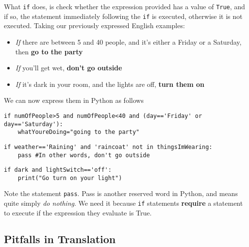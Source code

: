 What \texttt{if} does, is check whether the expression provided has a value   of \texttt{True}, and if so, the statement immediately following the \texttt{if} is   executed, otherwise it is not executed.    Taking our previously expressed English examples:
\begin{itemize}
	\item \textit{If} there are between 5 and 40 people, and it's either a Friday or a Saturday, then \textbf{go to the party}
	\item \textit{If} you'll get wet, \textbf{don't go outside}
	\item \textit{If} it's dark in your room, and the lights are off, \textbf{turn them on}
\end{itemize}

We can now express them in Python as follows
\begin{lstlisting}
if numOfPeople>5 and numOfPeople<40 and (day=='Friday' or day=='Saturday'):
    whatYoureDoing="going to the party"
\end{lstlisting}
\begin{lstlisting}
if weather=='Raining' and 'raincoat' not in thingsImWearing:
    pass #In other words, don't go outside
\end{lstlisting}
\begin{lstlisting}
if dark and lightSwitch=='off':
    print("Go turn on your light")
\end{lstlisting}

Note the statement 
\texttt{pass}. Pass   is another reserved word in Python, and means quite simply \textit{do   nothing}. We need it because \texttt{if} statements \textbf{require} a   statement to execute if the expression they evaluate is True.

\subsection{Pitfalls in Translation}


